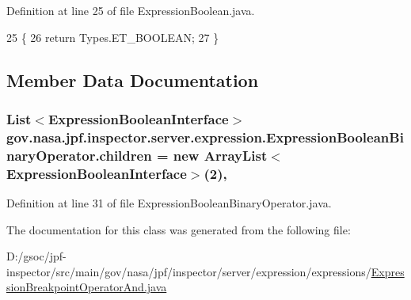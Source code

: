 Definition at line 25 of file Expression\+Boolean.\+java.


\begin{DoxyCode}
25                           \{
26     \textcolor{keywordflow}{return} Types.ET\_BOOLEAN;
27   \}
\end{DoxyCode}


\subsection{Member Data Documentation}
\subsubsection[{\texorpdfstring{children}{children}}]{\setlength{\rightskip}{0pt plus 5cm}List$<${\bf Expression\+Boolean\+Interface}$>$ gov.\+nasa.\+jpf.\+inspector.\+server.\+expression.\+Expression\+Boolean\+Binary\+Operator.\+children = new Array\+List$<${\bf Expression\+Boolean\+Interface}$>$(2)\hspace{0.3cm}{\ttfamily [protected]}, {\ttfamily [inherited]}}\hypertarget{classgov_1_1nasa_1_1jpf_1_1inspector_1_1server_1_1expression_1_1_expression_boolean_binary_operator_aa51f2a94e4b46898cc588a25f3957f6f}{}\label{classgov_1_1nasa_1_1jpf_1_1inspector_1_1server_1_1expression_1_1_expression_boolean_binary_operator_aa51f2a94e4b46898cc588a25f3957f6f}


Definition at line 31 of file Expression\+Boolean\+Binary\+Operator.\+java.



The documentation for this class was generated from the following file\+:\begin{DoxyCompactItemize}
\item 
D\+:/gsoc/jpf-\/inspector/src/main/gov/nasa/jpf/inspector/server/expression/expressions/\hyperlink{_expression_breakpoint_operator_and_8java}{Expression\+Breakpoint\+Operator\+And.\+java}\end{DoxyCompactItemize}
